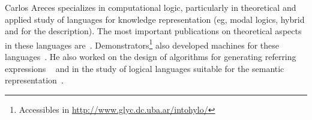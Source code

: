 

Carlos Areces specializes in computational logic, particularly in
theoretical and applied study of languages for knowledge representation (eg,
modal logics, hybrid and for the description). The most important publications
on theoretical aspects in these languages are~\cite{ABM01,arec:hybr05b}.
Demonstrators\footnote{Accessibles in
\url{http://www.glyc.dc.uba.ar/intohylo/}} also developed machines for these
languages~\cite{ANR01,arec:hylo02a,AG06,Hoffmann2007}. He also worked
on the design of algorithms for generating referring expressions ~\cite{AKS08}
and in the study of logical languages suitable for the semantic
representation~\cite{AF08}.


